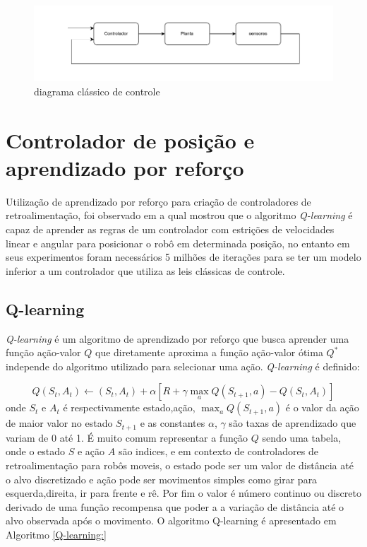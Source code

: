 \begin{figure}[H]
    \centering
    \includegraphics[scale=0.6]{figuras/sistema_classico_controle.pdf}
    \caption{diagrama clássico de controle}
\end{figure}

\section{Controlador de posição e aprendizado por reforço }

Utilização de aprendizado por reforço para criação de controladores
de retroalimentação, foi observado em \cite{farias2020position}
a qual mostrou que o algoritmo \textit{Q-learning} é capaz de aprender
as regras de um controlador com estrições de velocidades linear e angular
para  posicionar o robô em determinada posição, no entanto em seus
experimentos foram necessários 5 milhões de iterações para se ter um modelo
inferior a um controlador que utiliza as leis clássicas de controle.

\subsection{Q-learning}
\textit{Q-learning} é um algoritmo de aprendizado por reforço que
busca aprender uma função ação-valor $Q$ que diretamente aproxima
a função ação-valor ótima $Q^*$ independe do algoritmo utilizado
para selecionar uma ação. \textit{Q-learning} é definido:

\begin{equation} 
    Q(S_t,A_t) \leftarrow (S_t,A_t) + \alpha[R + \gamma  \max_aQ(S_{t +1},a) - Q(S_t,A_t)]
\end{equation}
onde $S_t$ e $A_t$ é respectivamente estado,ação,  $ \max_a Q(S_{t +1},a)$ é o valor da
ação de maior valor no estado $S_{t+1}$ e as constantes $\alpha$, $\gamma$ são taxas
de aprendizado que variam de 0 até 1. É muito comum representar a função $Q$
sendo uma tabela, onde o estado $S$ e ação $A$ são indices, e em contexto de
controladores de retroalimentação para robôs moveis, o estado pode ser um
valor de distância até o alvo discretizado e ação pode ser movimentos simples
como girar para esquerda,direita, ir para frente e rê. Por fim o valor é
número continuo ou discreto derivado de uma função recompensa que poder
a a variação de distância até o alvo observada após o movimento. O algoritmo
Q-learning é apresentado em Algoritmo  \ref{Q-learning:}



